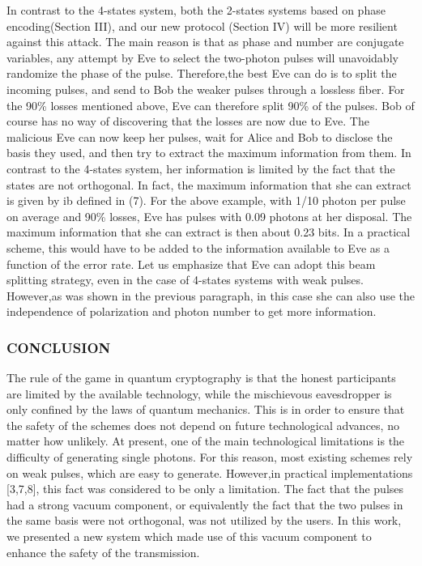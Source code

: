 In contrast to the 4-states system, both the 2-states systems based on phase encoding(Section III), and our new protocol (Section IV) will be more resilient against this attack. The main reason is that as phase and number are conjugate variables, any attempt by Eve to select the two-photon pulses will unavoidably randomize the phase of the pulse. Therefore,the best Eve can do is to split the incoming pulses, and send to Bob the weaker pulses through a lossless fiber. For the 90\% losses mentioned above, Eve can therefore split 90\% of the pulses. Bob of course has no way of discovering that the losses are now due to Eve. The malicious Eve can now keep her pulses, wait for Alice and Bob to disclose the basis they used, and then try to extract the maximum information from them. In contrast to the 4-states system, her information is limited by the fact that the states are not orthogonal. In fact, the maximum information that she can extract is given by ib defined in (7). For the above example, with 1/10 photon per pulse on average and 90\% losses, Eve has pulses with 0.09 photons at her disposal. The maximum information that she can extract is then about 0.23 bits. In a practical scheme, this would have to be added to the information available to Eve as a function of the error rate. Let us emphasize that Eve can adopt this beam splitting strategy, even in the case of 4-states systems with weak pulses. However,as was shown in the previous paragraph, in this case she can also use the independence of polarization and photon number to get more information. 


\subsubsection{CONCLUSION}

The rule of the game in quantum cryptography is that the honest participants are limited by the available technology, while the mischievous eavesdropper is only confined by the laws of quantum mechanics. This is in order to ensure that the safety of the schemes does not depend on future technological advances, no matter how unlikely. At present, one of the main technological limitations is the difficulty of generating single photons. For this reason, most existing schemes rely on weak pulses, which are easy to generate. However,in practical implementations [3,7,8], this fact was considered to be only a limitation. The fact that the pulses had a strong vacuum component, or equivalently the fact that the two pulses in the same basis were not orthogonal, was not utilized by the users. In this work, we presented a new system which made use of this vacuum component to enhance the safety of the transmission.

